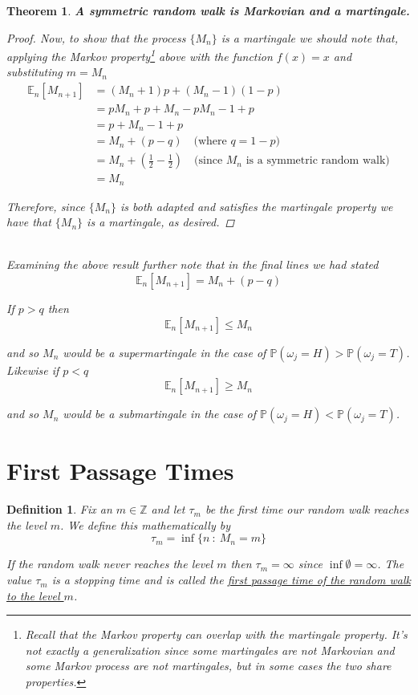 \documentclass[12pt]{article}
\newtheorem{definition}{Definition}
\newtheorem{theorem}{Theorem}
\newlength\tindent
\renewcommand{\indent}{\hspace*{\tindent}}
\newcommand{\Z}{\mathbb Z}
\renewcommand{\P}{\mathbb P}
\newcommand{\E}{\mathbb E}
\begin{document}
\begin{theorem} {\bf A symmetric random walk is Markovian and a martingale.}
\begin{proof}
\indent Now, to show that the process $\{M_n\}$ is a martingale we should note that, applying the Markov property\footnote{Recall that the Markov property can overlap with the martingale property. It's not exactly a generalization since some martingales are not Markovian and some Markov process are not martingales, but in some cases the two share properties.} above with the function $f(x) = x$ and substituting $m = M_n$
\begin{align*}
	\E_n[M_{n + 1}] &= (M_n + 1)p + (M_n - 1)(1 - p) \\
	&= pM_n + p + M_n - pM_n - 1 + p \\
	&= p + M_n - 1 + p \\
	&= M_n + (p - q) \quad \text{(where $q = 1 - p$)} \\
	&= M_n + \left( \frac{1}{2} - \frac{1}{2} \right) \quad \text{(since $M_n$ is a symmetric random walk)} \\
	&= M_n
\end{align*}

\indent Therefore, since $\{M_n\}$ is both adapted and satisfies the martingale property we have that $\{M_n\}$ is a martingale, as desired. 
\end{proof} \hfill\\

Examining the above result further note that in the final lines we had stated
\begin{equation*}
	\E_n[M_{n + 1}] = M_n + (p - q)
\end{equation*}

If $p > q$ then 
\begin{equation*}
	\E_n[M_{n + 1}] \leq M_n
\end{equation*}

and so $M_n$ would be a {\em supermartingale} in the case of $\P(\omega_j = H) > \P(\omega_j = T)$. Likewise if $p <  q$
\begin{equation*}
	\E_n[M_{n + 1}] \geq M_n
\end{equation*}

and so $M_n$ would be a {\em submartingale} in the case of $\P(\omega_j = H) < \P(\omega_j = T)$.
\end{theorem}

\section{First Passage Times}

\begin{definition} Fix an $m \in \Z$ and let $\tau_m$ be the first time our random walk reaches the level $m$. We define this mathematically by
\begin{equation*}
	\tau_m = \inf \{n~:~M_n = m\}
\end{equation*}

\indent If the random walk never reaches the level $m$ then $\tau_m = \infty$ since $\inf \emptyset = \infty$. The value $\tau_m$ is a stopping time and is called the \underline{first passage time of the random walk to the level $m$}. 
\end{definition}
\end{document}
